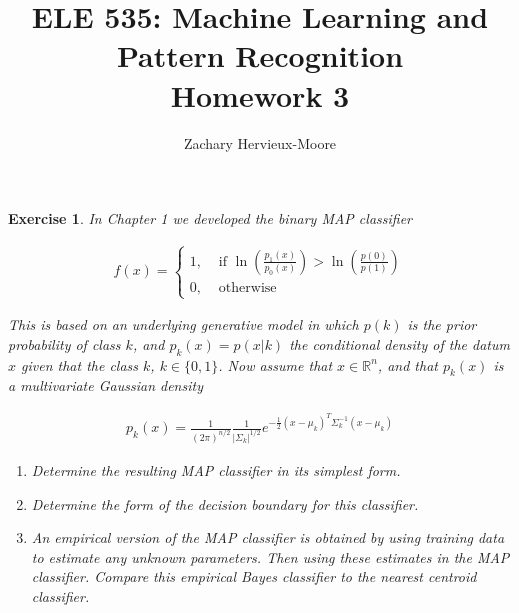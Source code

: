 \documentclass[12pt]{article}
\title{ELE 535: Machine Learning and Pattern Recognition \\ Homework 3}
\author{Zachary Hervieux-Moore}
\date{\displaydate{date}}
\theoremstyle{colon}
\newtheorem{exercise}{Exercise}
\begin{document}
\maketitle

\clearpage

\begin{exercise}
  In Chapter 1 we developed the binary MAP classifier

  \begin{gather*}
    f(x) = \begin{cases}
      1, &\text{ if } \ln \left( \frac{p_1(x)}{p_0(x)} \right) > \ln \left( \frac{p(0)}{p(1)} \right) \\
      0, &\text{ otherwise}
    \end{cases}
  \end{gather*}

  This is based on an underlying generative model in which $p(k)$ is the prior probability of class $k$, and $p_k(x) = p(x | k)$ the conditional density of the datum $x$ given that the class $k$, $k \in \{0, 1\}$. Now assume that $x \in \mathbb{R}^n$, and that $p_k(x)$ is a multivariate Gaussian density

  \begin{gather*}
    p_k(x) = \frac{1}{(2 \pi)^{n/2}} \frac{1}{\lvert \Sigma_k \rvert^{1/2}} e^{-\frac{1}{2} (x - \mu_k)^T \Sigma_k^{-1} (x - \mu_k)}
  \end{gather*}

  \begin{enumerate}[label=\alph*)]
    \item Determine the resulting MAP classifier in its simplest form.
    \item Determine the form of the decision boundary for this classifier.
    \item An empirical version of the MAP classifier is obtained by using training data to estimate any unknown parameters. Then using these estimates in the MAP classifier. Compare this empirical Bayes classifier to the nearest centroid classifier.
  \end{enumerate}
\end{exercise}
\end{document}
